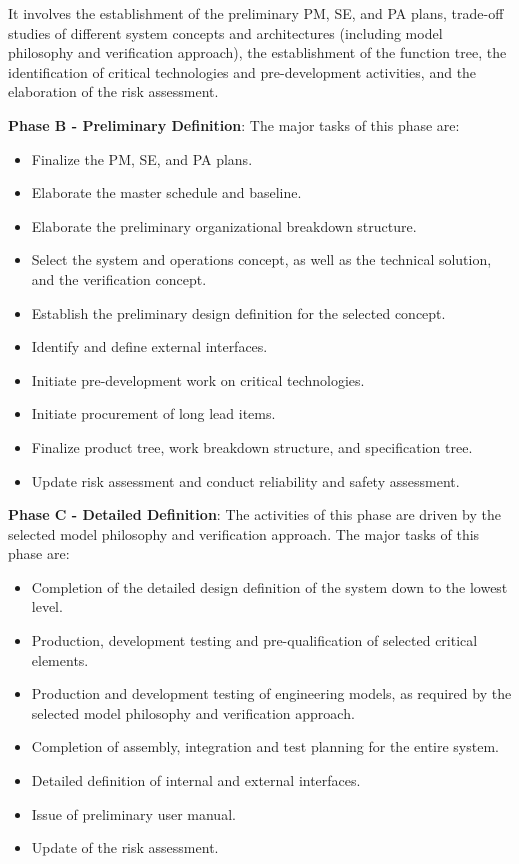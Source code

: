  It involves the establishment of the preliminary PM, SE, and PA plans, trade-off studies of different system concepts and architectures (including model philosophy and verification approach), the establishment of the function tree, the identification of critical technologies and pre-development activities, and the elaboration of the risk assessment.

\textbf{Phase B - Preliminary Definition}: The major tasks of this phase are:
\begin{itemize}
\item Finalize the PM, SE, and PA plans.
\item Elaborate the master schedule and baseline.
\item Elaborate the preliminary organizational breakdown structure.
\item Select the system and operations concept, as well as the technical solution, and the verification concept.
\item Establish the preliminary design definition for the selected concept.
\item Identify and define external interfaces.
\item Initiate pre-development work on critical technologies.
\item Initiate procurement of long lead items.
\item Finalize product tree, work breakdown structure, and specification tree.
\item Update risk assessment and conduct reliability and safety assessment.
\end{itemize}

\textbf{Phase C - Detailed Definition}: The activities of this phase are driven by the selected model philosophy and verification approach. The major tasks of this phase are:
\begin{itemize}
\item Completion of the detailed design definition of the system down to the lowest level.
\item Production, development testing and pre-qualification of selected critical elements.
\item Production and development testing of engineering models, as required
by the selected model philosophy and verification approach.
\item Completion of assembly, integration and test planning for the entire system.
\item Detailed definition of internal and external interfaces.
\item Issue of preliminary user manual.
\item Update of the risk assessment.
\end{itemize}

